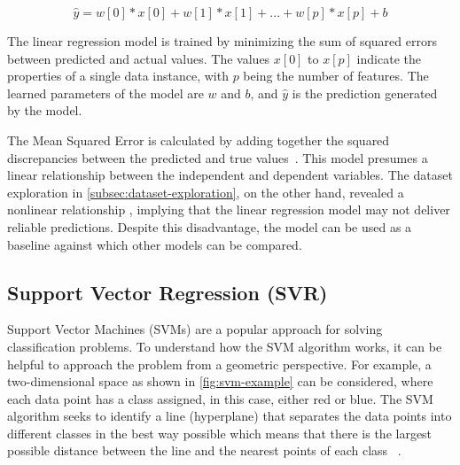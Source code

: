 {\begin{tcolorbox}[arc=0pt,boxrule=0.5pt]
    \begin{equation}
        \hat{y} = w[0] * x[0] + w[1] * x[1] + ... + w[p] * x[p] + b
        \label{eq:linear-regression}
    \end{equation}
\end{tcolorbox}

The linear regression model is trained by minimizing the sum of squared errors between predicted and actual values.
The values $x[0]$ to $x[p]$ indicate the properties of a single data instance, with $p$ being the number of
features.
The learned parameters of the model are $w$ and $b$, and $\hat{y}$  is the prediction generated by the model.

The Mean Squared Error is calculated by adding together the squared discrepancies between the predicted and true
values~\cite[p. 47--68]{muller_introductionmachinelearning_2016}.
This model presumes a linear relationship between the independent and dependent variables.
The dataset exploration in \cref{subsec:dataset-exploration}, on the other hand, revealed a nonlinear relationship
, implying that the linear regression model may not deliver reliable predictions.
Despite this disadvantage, the model can be used as a baseline against which other models can be compared.



\subsection{Support Vector Regression (SVR)}\label{subsec:support-vector-regression-(svr)}
Support Vector Machines (SVMs) are a popular approach for solving classification problems.
To understand how the SVM algorithm works, it can be helpful to approach the problem from a geometric perspective.
For example, a two-dimensional space as shown in \cref{fig:svm-example} can be considered, where each data point
has a class assigned, in this case, either red or blue.
The SVM algorithm seeks to identify a line (hyperplane) that separates the data points into different classes in the
best way possible which means that there is the largest possible distance between the line and the
nearest points of each class
~\cite[pp. 92--96]{muller_introductionmachinelearning_2016}.

}
